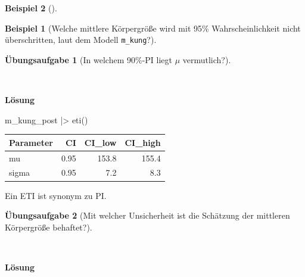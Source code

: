 \documentclass[
  ngerman,
  letterpaper,
  twoside,
  open=any]{scrbook}
\newenvironment{Shaded}{\begin{snugshade}}{\end{snugshade}}
\newcommand{\FunctionTok}[1]{\textcolor[rgb]{0.28,0.35,0.67}{#1}}
\newcommand{\NormalTok}[1]{\textcolor[rgb]{0.00,0.23,0.31}{#1}}
\newcommand{\SpecialCharTok}[1]{\textcolor[rgb]{0.37,0.37,0.37}{#1}}
\newcounter{none} %
\theoremstyle{definition}
\newtheorem{example}{Beispiel}[chapter]
\theoremstyle{plain}
\theoremstyle{definition}
\newtheorem{exercise}{Übungsaufgabe}[chapter]
\theoremstyle{definition}
\theoremstyle{remark}
\begin{document}
\begin{example}[]
\begin{example}[Welche mittlere Körpergröße wird mit 95\%
Wahrscheinlichkeit nicht überschritten, laut dem Modell
\texttt{m\_kung}?]
\begin{tcolorbox}[enhanced jigsaw, arc=.35mm, bottomrule=.15mm, breakable, colback=white, colframe=quarto-callout-tip-color-frame, left=2mm, leftrule=.75mm, opacityback=0, rightrule=.15mm, toprule=.15mm]
\end{tcolorbox}

\end{example}

\begin{exercise}[In welchem 90\%-PI liegt \(\mu\)
vermutlich?]\protect\hypertarget{exr-kung4}{}\label{exr-kung4}

~

\begin{tcolorbox}[enhanced jigsaw, arc=.35mm, bottomrule=.15mm, breakable, colback=white, colframe=quarto-callout-tip-color-frame, left=2mm, leftrule=.75mm, opacityback=0, rightrule=.15mm, toprule=.15mm]

\vspace{-3mm}\textbf{Lösung}\vspace{3mm}

\begin{Shaded}
\begin{Highlighting}[]
\NormalTok{m\_kung\_post }\SpecialCharTok{|\textgreater{}} 
  \FunctionTok{eti}\NormalTok{()}
\end{Highlighting}
\end{Shaded}

{\def\LTcaptype{none} %
\begin{longtable}[]{@{}lrrr@{}}
\toprule\noalign{}
Parameter & CI & CI\_low & CI\_high \\
\midrule\noalign{}
\endhead
\bottomrule\noalign{}
\endlastfoot
mu & 0.95 & 153.8 & 155.4 \\
sigma & 0.95 & 7.2 & 8.3 \\
\end{longtable}
}

Ein ETI ist synonym zu PI.

\end{tcolorbox}

\end{exercise}

\begin{exercise}[Mit welcher Unsicherheit ist die Schätzung der
mittleren Körpergröße
behaftet?]\protect\hypertarget{exr-kung5}{}\label{exr-kung5}

~

\begin{tcolorbox}[enhanced jigsaw, arc=.35mm, bottomrule=.15mm, breakable, colback=white, colframe=quarto-callout-tip-color-frame, left=2mm, leftrule=.75mm, opacityback=0, rightrule=.15mm, toprule=.15mm]

\vspace{-3mm}\textbf{Lösung}\vspace{3mm}


\end{tcolorbox}
\end{exercise}
\end{example}
\end{document}
